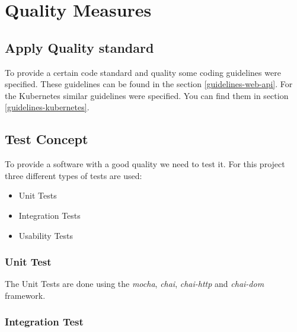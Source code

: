 \chapter{Quality Measures}



\section{Apply Quality standard}
To provide a certain code standard and quality some coding guidelines were specified.
These guidelines can be found in the section \ref{guidelines-web-api}.
For the Kubernetes similar guidelines were specified.
You can find them in section \ref{guidelines-kubernetes}.


\section{Test Concept}
To provide a software with a good quality we need to test it.
For this project three different types of tests are used:

\begin{itemize}
  \item Unit Tests
  \item Integration Tests
  \item Usability Tests
\end{itemize}

\subsection{Unit Test}
The Unit Tests are done using the \textit{mocha}, \textit{chai}, \textit{chai-http} and \textit{chai-dom} framework.

\subsection{Integration Test}
